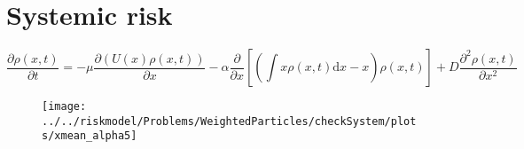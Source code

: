 \documentclass[]{article}
\newcommand{\pa}[2]{\frac{\partial #1}{\partial #2}}
\newcommand{\ppa}[2]{\frac{\partial^2 #1}{\partial #2^2}}
\begin{document}
\begin{abstract}

\end{abstract}

\section{Systemic risk}


\begin{equation}
\label{fokkerplanck}
\pa{\rho(x,t)}{t} = - \mu \pa{( U(x) \rho(x,t))}{x} - \alpha \pa{}{x} \left[ \left(\int x \rho(x,t) \mathrm{d}x  -x \right) \rho(x,t) \right] + D  \ppa{\rho(x,t)}{x} 
\end{equation}


\begin{figure}
\texttt{[image: ../../riskmodel/Problems/WeightedParticles/checkSystem/plots/xmean\_alpha5]}

\end{figure}
\end{document}
